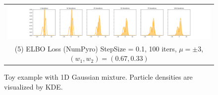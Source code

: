 \begin{figure}[!htbp]
    
    \begin{tabular}{@{}c@{}}
        \includegraphics[width=\textwidth]{figs/toy-figure1-numpyro.png} \\
        \small (5) ELBO Loss (NumPyro) StepSize = 0.1, 100 iters, $\mu = \pm 3$, $(w_1, w_2) = (0.67, 0.33)$
    \end{tabular}
     
    \caption{Toy example with 1D Gaussian mixture. Particle densities are visualized by KDE.}
    \label{fig:toy1dgaussian}
\end{figure}
